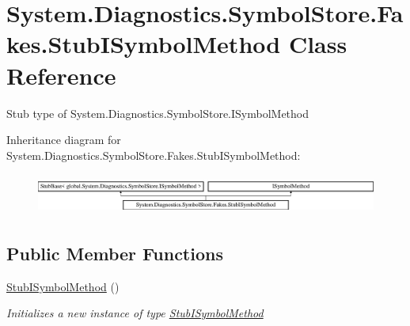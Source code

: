 \hypertarget{class_system_1_1_diagnostics_1_1_symbol_store_1_1_fakes_1_1_stub_i_symbol_method}{\section{System.\-Diagnostics.\-Symbol\-Store.\-Fakes.\-Stub\-I\-Symbol\-Method Class Reference}
\label{class_system_1_1_diagnostics_1_1_symbol_store_1_1_fakes_1_1_stub_i_symbol_method}
}


Stub type of System.\-Diagnostics.\-Symbol\-Store.\-I\-Symbol\-Method 


Inheritance diagram for System.\-Diagnostics.\-Symbol\-Store.\-Fakes.\-Stub\-I\-Symbol\-Method\-:\begin{figure}[H]
\begin{center}
\leavevmode
\includegraphics[height=1.369193cm]{class_system_1_1_diagnostics_1_1_symbol_store_1_1_fakes_1_1_stub_i_symbol_method}
\end{center}
\end{figure}
\subsection*{Public Member Functions}
\begin{DoxyCompactItemize}
\item 
\hyperlink{class_system_1_1_diagnostics_1_1_symbol_store_1_1_fakes_1_1_stub_i_symbol_method_a6289414ad4030aa71b3ee5f8386b2bec}{Stub\-I\-Symbol\-Method} ()
\begin{DoxyCompactList}\small\item\em Initializes a new instance of type \hyperlink{class_system_1_1_diagnostics_1_1_symbol_store_1_1_fakes_1_1_stub_i_symbol_method}{Stub\-I\-Symbol\-Method}\end{DoxyCompactList}\end{DoxyCompactItemize}
